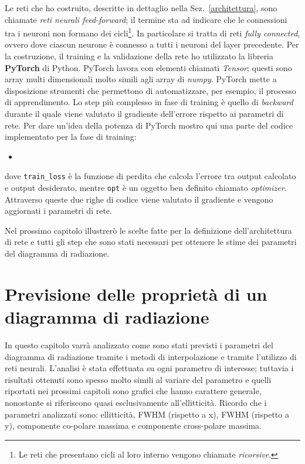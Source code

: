 \documentclass[12pt,a4paper,final]{book}
\newcommand{\insertcode}[2]{\begin{itemize}\item[]\end{itemize}} %
\begin{document}
Le reti che ho costruito, descritte in dettaglio nella Sez.~\ref{architettura}, sono chiamate \textit{reti neurali feed-forward}; il termine sta ad indicare che le connessioni tra i neuroni non formano dei cicli\footnote{Le reti che presentano cicli al loro interno vengono chiamate \textit{ricorsive}.}. In particolare si tratta di reti \textit{fully connected}, ovvero dove ciascun neurone è connesso a tutti i neuroni del layer precedente.
Per la costruzione, il training e la validazione della rete ho utilizzato la libreria \textbf{PyTorch} di Python. 
PyTorch lavora con elementi chiamati \textit{Tensor}; questi sono array multi dimensionali molto simili agli array di \textit{numpy}. PyTorch mette a disposizione strumenti che permettono di automatizzare, per esempio, il processo di apprendimento. Lo step più complesso in fase di training è quello di \textit{backward} durante il quale viene valutato il gradiente dell'errore rispetto ai parametri di rete. Per dare un'idea della potenza di PyTorch mostro qui una parte del codice implementato per la fase di training:
\insertcode{../scripts/opt.py}{}\label{opt}
dove \texttt{train\_loss} \`e la funzione di perdita che calcola l'errore tra output calcolato e output desiderato, mentre \texttt{opt} \`e un oggetto ben definito chiamato \textit{optimizer}.
Attraverso queste due righe di codice viene valutato il gradiente e vengono aggiornati i parametri di rete.


Nel prossimo capitolo illustrerò le scelte fatte per la definizione dell'architettura di rete e tutti gli step che sono stati necessari per ottenere le stime dei parametri del diagramma di radiazione.




\chapter{Previsione delle proprietà di un diagramma di radiazione}\label{prev_param}
In questo capitolo varrà analizzato come sono stati previsti i parametri del diagramma di radiazione tramite i metodi di interpolazione e tramite l'utilizzo di reti neurali. 
L'analisi è stata effettuata su ogni parametro di interesse; tuttavia i risultati ottenuti sono spesso molto simili al variare del parametro e quelli riportati nei prossimi capitoli sono grafici che hanno carattere generale, nonostante si riferiscono quasi esclusivamente all'ellitticità. Ricordo che i parametri analizzati sono: ellitticità, FWHM (rispetto a x), FWHM (rispetto a y), componente co-polare massima e componente cross-polare massima.
\end{document}
